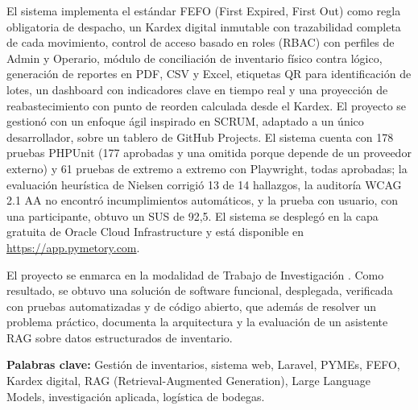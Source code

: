El sistema implementa el estándar FEFO (First Expired, First Out) como regla obligatoria de despacho, un Kardex digital inmutable con trazabilidad completa de cada movimiento, control de acceso basado en roles (RBAC) con perfiles de Admin y Operario, módulo de conciliación de inventario físico contra lógico, generación de reportes en PDF, CSV y Excel, etiquetas QR para identificación de lotes, un dashboard con indicadores clave en tiempo real y una proyección de reabastecimiento con punto de reorden calculada desde el Kardex. El proyecto se gestionó con un enfoque ágil inspirado en SCRUM, adaptado a un único desarrollador, sobre un tablero de GitHub Projects. El sistema cuenta con 178 pruebas PHPUnit (177 aprobadas y una omitida porque depende de un proveedor externo) y 61 pruebas de extremo a extremo con Playwright, todas aprobadas; la evaluación heurística de Nielsen corrigió 13 de 14 hallazgos, la auditoría WCAG 2.1 AA no encontró incumplimientos automáticos, y la prueba con usuario, con una participante, obtuvo un SUS de 92,5. El sistema se desplegó en la capa gratuita de Oracle Cloud Infrastructure y está disponible en \url{https://app.pymetory.com}.

El proyecto se enmarca en la modalidad de Trabajo de Investigación \cite{univalle_resolucion137}. Como resultado, se obtuvo una solución de software funcional, desplegada, verificada con pruebas automatizadas y de código abierto, que además de resolver un problema práctico, documenta la arquitectura y la evaluación de un asistente RAG sobre datos estructurados de inventario.

\textbf{Palabras clave:} Gestión de inventarios, sistema web, Laravel, PYMEs, FEFO, Kardex digital, RAG (Retrieval-Augmented Generation), Large Language Models, investigación aplicada, logística de bodegas.
